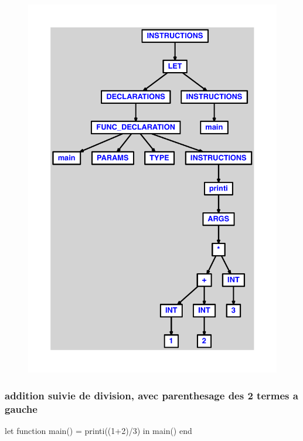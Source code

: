 \documentclass{article}
\begin{document}
\begin{figure}[H]\centering\includegraphics[max width=\textwidth]{ast/ast_97.pdf}\end{figure}\subsubsection{addition suivie de division, avec parenthesage des 2 termes a gauche}
\begin{verbatimtab}
let function main() = printi((1+2)/3) in main() end
\end{verbatimtab}
\end{document}

